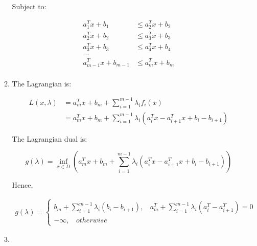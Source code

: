 \documentclass[11pt, letterpaper, titlepage]{article}
\begin{document}
\begin{enumerate}
\begin{enumerate}
        Subject to:
        
        \begin{equation*}
            \begin{aligned}
                a^T_1 x + b_1 &\leq a^T_2 x + b_2 \\
                a^T_2 x + b_2 &\leq a^T_3 x + b_3 \\
                a^T_3 x + b_3 &\leq a^T_4 x + b_4 \\
                ... \\
                a^T_{m-1} x + b_{m-1} &\leq a^T_m x + b_m \\
            \end{aligned}
        \end{equation*}
        
        \item %
        
        The Lagrangian is:
        
        \begin{equation*}
            \begin{aligned}
                L(x, \lambda) &= a_m^T x + b_m + \sum_{i = 1}^{m-1} \lambda_i f_i(x) \\
                &= a_m^T x + b_m + \sum_{i = 1}^{m-1} \lambda_i (a_i^T x - a_{i+1}^T x + b_i - b_{i+1})
            \end{aligned}
        \end{equation*}
        
        The Lagrangian dual is:
        
        \begin{equation*}
            g(\lambda) = \inf_{x \in D} (a_m^T x + b_m + \sum_{i = 1}^{m-1} \lambda_i (a_i^T x - a_{i+1}^T x + b_i - b_{i+1}))
        \end{equation*}
        
        Hence,
        
        \begin{gather*}
            g(\lambda) = 
            \begin{cases}
                b_m + \sum_{i = 1}^{m-1} \lambda_i (b_i - b_{i+1}) ,\ \ \ \ a_m^T + \sum_{i = 1}^{m - 1} \lambda_i (a_i^T  - a_{i+1}^T)  = 0 \\
                - \infty , \ \ \ \ otherwise
            \end{cases}
        \end{gather*}
        
        \item %
        

\end{enumerate}
\end{enumerate}
\end{document}
